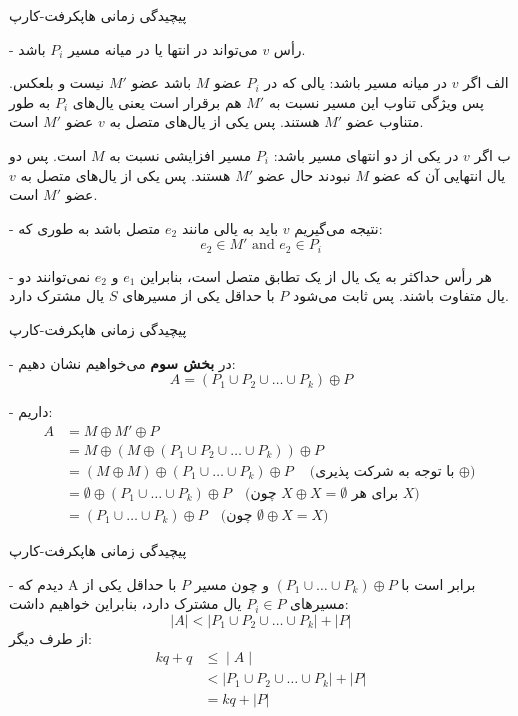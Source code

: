\begin{itemframe}{‌پیچیدگی زمانی هاپکرفت-کارپ}
\decLineSpace
\item[-]
رأس $v$ می‌تواند در انتها یا در میانه مسیر $P_i$ باشد.
\item[الف]
اگر $v$ در میانه مسیر باشد: یالی که در $P_i$ عضو  $M$ باشد عضو $M'$ نیست و بلعکس. پس ویژگی تناوب این مسیر نسبت به $M'$ هم برقرار است یعنی یال‌های $P_i$ به طور متناوب عضو $M'$ هستند. پس یکی از یال‌های متصل به $v$ عضو $M'$ است.
\item[ب]
اگر $v$ در یکی از دو انتهای مسیر باشد: $P_i$ مسیر افزایشی نسبت به $M$ است. پس دو یال انتهایی آن که عضو $M$ نبودند حال عضو $M'$ هستند. پس یکی از یال‌های متصل به $v$ عضو $M'$ است.\\
\item[-]
نتیجه می‌گیریم $v$ باید به یالی مانند
$e_2$
 متصل باشد به طوری که:
$$e_2 \in M' \text{ and } e_2 \in P_i$$


\item[-]
هر رأس حداکثر به یک یال از یک تطابق متصل است، بنابراین
$e_1$
و
$e_2$
نمی‌توانند دو یال متفاوت باشند. پس ثابت می‌شود $P$ با حداقل یکی از مسیرهای $S$ یال مشترک دارد.
\end{itemframe}


\begin{itemframe}{‌پیچیدگی زمانی هاپکرفت-کارپ}
\item[-]
در \textbf{بخش سوم} می‌خواهیم نشان دهیم:
$$
A = (P_1 \cup P_2 \cup \dots \cup P_k) \oplus P
$$
\item[-]
داریم:
\begin{align*}
A &= M \oplus M' \oplus P \\
& = M \oplus (M \oplus (P_1 \cup P_2 \cup \dots \cup P_k)) \oplus P \\
&= (M \oplus M) \oplus (P_1 \cup \dots \cup P_k) \oplus P \quad
\text{(با توجه به شرکت پذیری $\oplus$)} \\
&= \emptyset \oplus (P_1 \cup \dots \cup P_k) \oplus P \quad
\text{(چون $X \oplus X = \emptyset$ برای هر $X$)} \\
&= (P_1 \cup \dots \cup P_k) \oplus P \quad
\text{(چون $\emptyset \oplus X = X$)}
\end{align*}

\end{itemframe}


\begin{itemframe}{‌پیچیدگی زمانی هاپکرفت-کارپ}
\item[-]
دیدم که A برابر است با
$
(P_1 \cup \dots \cup P_k) \oplus P
$
و چون مسیر $P$ با حداقل یکی از مسیرهای $P_i \in P$ یال مشترک دارد، بنابراین خواهیم داشت:
$$
|A| < |P_1 \cup P_2 \cup \dots \cup P_k| + |P|
$$
از طرف دیگر:
\begin{align*}
kq+q & ≤∣A∣\\
& < |P_1 \cup P_2 \cup \dots \cup P_k| + |P|\\
& = kq + |P|
\end{align*}

\end{itemframe}



